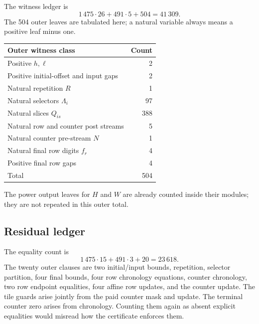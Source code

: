 \documentclass[11pt,letterpaper]{article}
\theoremstyle{definition}
\theoremstyle{remark}
\begin{document}
The witness ledger is
\begin{equation}\label{gts:cm:eq:witnessledger}
 1\,475\cdot26+491\cdot5+504=41\,309.
\end{equation}
The 504 outer leaves are tabulated here; a natural variable always means a positive leaf minus one.
\begin{center}
\begin{tabular}{lr}
\toprule
Outer witness class & Count\\
\midrule
Positive $h,\ell$ & 2\\
Positive initial-offset and input gaps & 2\\
Natural repetition $R$ & 1\\
Natural selectors $\Lambda_i$ & 97\\
Natural slices $Q_{is}$ & 388\\
Natural row and counter post streams & 5\\
Natural counter pre-stream $N$ & 1\\
Natural final row digits $f_r$ & 4\\
Positive final row gaps & 4\\
\midrule
Total & 504\\
\bottomrule
\end{tabular}
\end{center}
The power output leaves for $H$ and $W$ are already counted inside their modules; they are not repeated in this outer total.

\subsection{Residual ledger}
The equality count is
\begin{equation}\label{gts:cm:eq:residuallocated}
 1\,475\cdot15+491\cdot3+20=23\,618.
\end{equation}
The twenty outer clauses are two initial/input bounds, repetition, selector partition, four final bounds, four row chronology equations, counter chronology, two row endpoint equalities, four affine row updates, and the counter update. The tile guards arise jointly from the paid counter mask and update. The terminal counter zero arises from chronology. Counting them again as absent explicit equalities would misread how the certificate enforces them.
\end{document}
